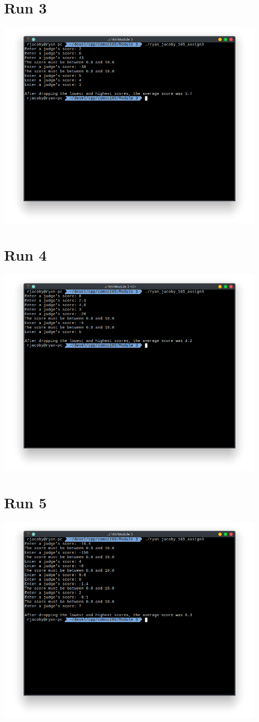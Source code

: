 \documentclass[letterpaper, 11pt]{article}
\begin{document}
\section*{Run 3}
\includegraphics[scale=0.5]{Module 3/run3.png}

\section*{Run 4}
\includegraphics[scale=0.5]{Module 3/run4.png}

\section*{Run 5}
\includegraphics[scale=0.5]{Module 3/run5.png}
\end{document}
